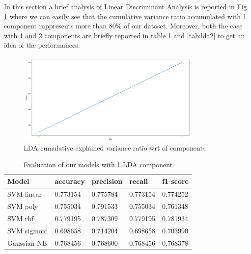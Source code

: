 \documentclass[a4paper,12pt]{article}
\begin{document}
In this section a brief analysis of Linear Discriminant Analysis is reported in Fig \ref{fig:lda} where we can easily see that the cumulative variance ratio accumulated with 1 component rappresents more than 80\% of our dataset.
Moreover, both the case with 1 and 2 components are briefly reported in table \ref{tab:lda1} and \ref{tab:lda2} to get an idea of the performances. 

\begin{figure}[H]
  \begin{center}
  \includegraphics[width=0.8\textwidth]{images/lda.png}
  \end{center}
  \caption{LDA cumulative explained variance ratio wrt of components}
  \label{fig:lda}
\end{figure}


\begin{table}[H]
\begin{tabular}{ |p{6cm}||p{2cm}|p{2cm}|p{2cm}|p{2cm}| }
  \hline
  Model& accuracy & precision  &  recall & f1 score \\
  \hline
  SVM linear           &0.773154&   0.775784&  0.773154&  0.774252\\
  SVM poly             &0.755034&   0.791533&  0.755034&  0.761348\\
  SVM rbf              &0.779195&   0.787309&  0.779195&  0.781934\\
  SVM sigmoid          &0.698658&   0.714204&  0.698658&  0.703990\\
  Gaussian NB          &0.768456&   0.768600&  0.768456&  0.768378\\
  \hline
\end{tabular}
\caption{Evaluation of our models with 1 LDA component}
\label{tab:lda1}
\end{table}
\end{document}
